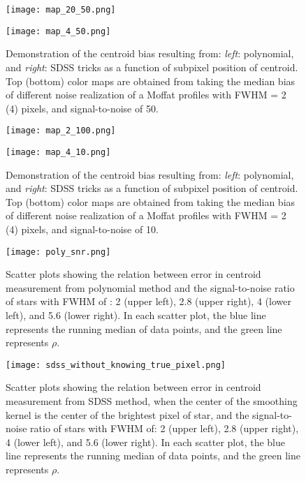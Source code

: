 \documentclass[12pt, preprint]{aastex}
\begin{document}
\begin{figure}[!htb]
  \texttt{[image: map\_20\_50.png]}
\endminipage

  \texttt{[image: map\_4\_50.png]}
\endminipage
\caption{Demonstration of the centroid bias resulting from: \emph{left}: polynomial, and \emph{right}: SDSS tricks as a function of subpixel position of centroid. Top  (bottom) color maps are obtained from taking the median bias of different noise realization of a Moffat profiles with FWHM = 2 (4) pixels, and signal-to-noise of 50.}\label{map}
\end{figure}

\begin{figure}[!htb]
  \texttt{[image: map\_2\_100.png]}
\endminipage

  \texttt{[image: map\_4\_10.png]}
\endminipage
\caption{Demonstration of the centroid bias resulting from: \emph{left}: polynomial, and \emph{right}: SDSS tricks as a function of subpixel position of centroid. Top  (bottom) color maps are obtained from taking the median bias of different noise realization of a Moffat profiles with FWHM = 2 (4) pixels, and signal-to-noise of 10.}\label{map2}
\end{figure}

\begin{figure}[!htb]
  \texttt{[image: poly\_snr.png]}
\endminipage
\caption{Scatter plots showing the relation between error in centroid measurement from polynomial method and the signal-to-noise ratio of stars with FWHM of : 2 (upper left), 2.8 (upper right), 4 (lower left), and 5.6 (lower right). In each scatter plot, the blue line represents the running median of data points, and the green line represents $\rho$.}\label{1}
\end{figure}

\begin{figure}[!htb]
  \texttt{[image: sdss\_without\_knowing\_true\_pixel.png]}
\endminipage
\caption{Scatter plots showing the relation between error in centroid measurement from SDSS method, when the center of the smoothing kernel is the center of the brightest pixel of star, and the signal-to-noise ratio of stars with FWHM of: 2 (upper left), 2.8 (upper right), 4 (lower left), and 5.6 (lower right). In each scatter plot, the blue line represents the running median of data points, and the green line represents $\rho$.}\label{2}
\end{figure}
\end{document}
